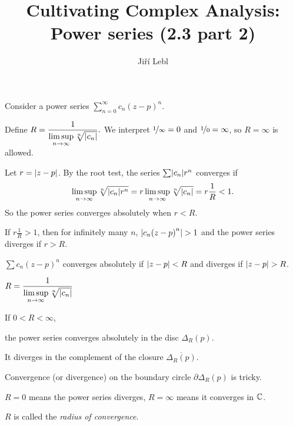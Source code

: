 \documentclass[10pt,aspectratio=169]{beamer}
\author{Ji\v{r}\'i Lebl}
\institute[OSU]{%
Departemento pri Matematiko de Oklahoma {\^S}tata Universitato}
\title{Cultivating Complex Analysis:\\%
Power series (2.3 part 2)}
\date{}
\begin{document}
\begin{frame}
\titlepage
\end{frame}

\begin{frame}
Consider a power series
\quad $\displaystyle
\sum_{n=0}^\infty c_n {(z-p)}^n .
$

\medskip
\pause

Define
\quad
$\displaystyle
R = \frac{1}{\limsup\limits_{n \to \infty} \sqrt[n]{\lvert {c_n} \rvert}} .
$
\quad
We interpret $\nicefrac{1}{\infty} = 0$ and $\nicefrac{1}{0} = \infty$,
so $R=\infty$ is allowed.

\medskip
\pause

Let $r=\left\lvert {z-p} \right\rvert$.
By the root test, the series $\sum \lvert {c_n} \rvert r^n$ converges if
\[
\limsup_{n \to \infty} \sqrt[n]{\lvert {c_n} \rvert r^n} = 
r \limsup_{n \to \infty} \sqrt[n]{\lvert {c_n} \rvert} = r \frac{1}{R} < 1 .
\]
\pause
So the power series converges absolutely when $r < R$.

\medskip
\pause

If $r \frac{1}{R} > 1$, then for infinitely many $n$,
$\lvert {c_n {(z-p)}^n} \rvert > 1$ and the power series diverges
if $r > R$.

\pause


\begin{proposition}
$\sum c_n {(z-p)}^n$ converges absolutely if
$\lvert {z-p} \rvert < R$ and diverges if
$\lvert {z-p} \rvert > R$.
\end{proposition}

\end{frame}

\begin{frame}
$\displaystyle
R = \frac{1}{\limsup\limits_{n \to \infty} \sqrt[n]{\lvert {c_n} \rvert}}
$

\vspace*{-0.7in}
\hspace*{2in}%

\vspace*{-0.1in}

If $0 < R < \infty$,

the power series converges absolutely
in the disc $\Delta_R(p)$.

\medskip
\pause

It diverges in the complement of the closure $\overline{\Delta_R(p)}$.

\medskip
\pause

Convergence (or divergence) on the boundary circle $\partial \Delta_R(p)$
is tricky.

\medskip
\pause

$R=0$ means the power series diverges, $R=\infty$ means it converges in
${\mathbb{C}}$.

\medskip
\pause

$R$ is called the \emph{radius of convergence}.
\end{frame}
\end{document}
